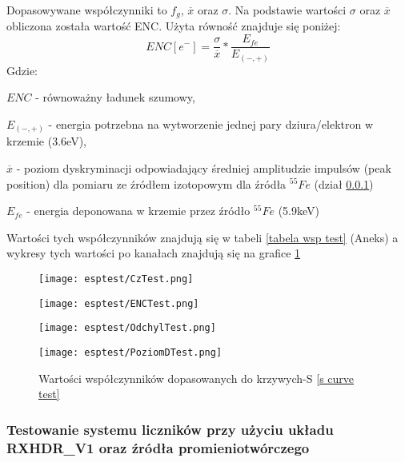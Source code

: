 Dopasowywane współczynniki to $f_g$, $\overline{x}$ oraz $\sigma$. Na podstawie wartości $\sigma$ oraz $\overline{x}$ obliczona została wartość ENC. Użyta równość znajduje się poniżej:
\begin{equation}
        ENC [e^-] = \frac{\sigma}{\overline{x}} * \frac{E_{fe}}{E_{(-,+)}}
\end{equation}
Gdzie:
\begin{description}
        \item $ENC$  - równoważny ładunek szumowy,
        \item $E_{(-,+)}$ - energia potrzebna na wytworzenie jednej pary dziura/elektron w krzemie (3.6eV),
        \item $\overline{x}$ - poziom dyskryminacji odpowiadający średniej amplitudzie impulsów (peak position) dla pomiaru ze źródłem izotopowym dla źródła ${}^{55}Fe$ (dział \ref{section RXHDR fe})
        \item $E_{fe}$ -  energia deponowana w krzemie przez źródło ${}^{55}Fe$  (5.9keV)
\end{description}

Wartości tych współczynników znajdują się w tabeli \ref{tabela wsp test} (Aneks) a wykresy tych wartości po kanałach znajdują się na grafice \ref{test fit wsp wyk} 

\begin{figure}[b]
        \begin{multicols}{2}
                \texttt{[image: esptest/CzTest.png]} \par
                \texttt{[image: esptest/ENCTest.png]} \par       
        \end{multicols} \hfill
        \begin{multicols}{2}
                \texttt{[image: esptest/OdchylTest.png]} \par
                \texttt{[image: esptest/PoziomDTest.png]} \par
        \end{multicols}
        \caption{Wartości współczynników dopasowanych do krzywych-S \ref{s curve test}}
        \label{test fit wsp wyk}
\end{figure}





\subsubsection{Testowanie systemu liczników przy użyciu układu RXHDR\_V1 oraz źródła promieniotwórczego}
\label{section RXHDR fe}

